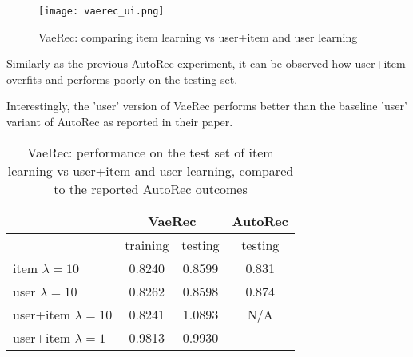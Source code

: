 \begin{figure}[H]
\centering
\texttt{[image: vaerec\_ui.png]}
\caption{VaeRec: comparing item learning vs user+item and user learning}
\label{vaerec_ui_fig}
\end{figure}

Similarly as the previous AutoRec experiment, it can be observed how user+item overfits and performs poorly on the testing
set.

Interestingly, the 'user' version of VaeRec performs better than the baseline 'user' variant
of AutoRec as reported in their paper.

\begin{table}[H]
\centering
\caption{VaeRec: performance on the test set of item learning vs user+item and user learning, compared to the reported AutoRec outcomes \cite{Sedhain2015}}
 \begin{tabular}{||l | c c |c||} 
 \hline
 & \multicolumn{2}{c}{VaeRec} & AutoRec \\ \hline
 & training & testing & testing \\ \hline
item $\lambda=10$& 0.8240&0.8599 & 0.831 \\
user $\lambda=10$ & 0.8262&0.8598 & 0.874 \\
user+item $\lambda=10$ & 0.8241 & 1.0893 & N/A\\
user+item $\lambda=1$ &0.9813 & 0.9930 &\\
\hline
\end{tabular}
\end{table}
